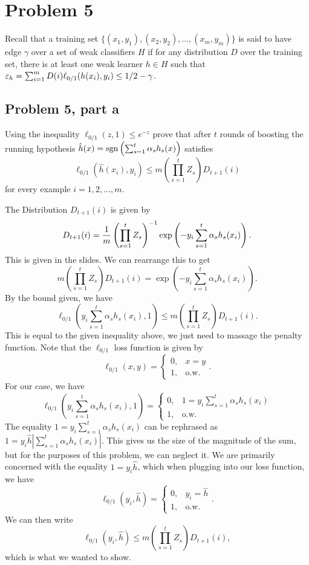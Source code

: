 \newpage
\section{Problem 5}
Recall that a training set $\{(x_1, y_1), (x_2, y_2), ..., (x_m, y_m)\}$ is said to have edge $\gamma$ over a set of weak classifiers $H$ if for any distribution $D$ over the training set, there is at least one weak learner $h \in H$ such that $\varepsilon_h = \sum_{i = 1}^m D(i)\ell_{0/1}(h(x_i), y_i) \leq 1/2 - \gamma$.

\subsection{Problem 5, part a}
Using the inequality $\ell_{0/1}(z, 1) \leq e^{-z}$ prove that after $t$ rounds of boosting the running hypothesis $\hat{h}(x) = \text{sgn} \left(\sum_{s = 1}^t \alpha_s h_s(x)\right)$ satisfies
\[\ell_{0/1} (\hat{h}(x_i), y_i) \leq m\left(\prod_{s = 1}^t Z_s\right) D_{t+1}(i)\]
for every example $i = 1, 2, ..., m$.
\partbreak
\begin{solution}

    The Distribution $D_{t+1}(i)$ is given by 
    \[D_{t+1}(i) = \frac{1}{m}\left(\prod_{s = 1}^t Z_s\right)^{-1} \exp\left(-y_i\sum_{s = 1}^t \alpha_sh_s(x_i)\right).\]
    This is given in the slides. We can rearrange this to get
    \[m\left(\prod_{s = 1}^tZ_s\right)D_{t+1}(i) = \exp\left(-y_i\sum_{s = 1}^t \alpha_s h_s(x_i)\right).\]
    By the bound given, we have 
    \[\ell_{0/1}\left(y_i\sum_{s = 1}^t\alpha_sh_s(x_i), 1\right) \leq m\left(\prod_{s = 1}^tZ_s\right)D_{t+1}(i).\]
    This is equal to the given inequality above, we just need to massage the penalty function. Note that the $\ell_{0/1}$ loss function is given by 
    \[\ell_{0/1}(x, y) = \begin{cases}0, &x = y\\1, &\text{o.w.}\end{cases}.\]
    For our case, we have 
    \[\ell_{0/1}\left(y_i\sum_{s = 1}^t\alpha_sh_s(x_i), 1\right) = \begin{cases}
        0, &1=y_i\sum_{s = 1}^t\alpha_sh_s(x_i)\\
        1, &\text{o.w.}
    \end{cases}\]
    The equality $1=y_i\sum_{s = 1}^t\alpha_sh_s(x_i)$ can be rephrased as $1=y_i\hat{h}\left|\sum_{s = 1}^t\alpha_sh_s(x_i)\right|$. This gives us the size of the magnitude of the sum, but for the purposes of this problem, we can neglect it. We are primarily concerned with the equality $1 = y_i\hat{h}$, which when plugging into our loss function, we have
    \[\ell_{0/1}(y_i, \hat{h}) = \begin{cases}
        0, &y_i = \hat{h}\\
        1, &\text{o.w.}
    \end{cases}.\]
    We can then write
    \[\ell_{0/1}(y_i, \hat{h}) \leq m\left(\prod_{s = 1}^tZ_s\right)D_{t+1}(i),\]
    which is what we wanted to show.
\end{solution}

